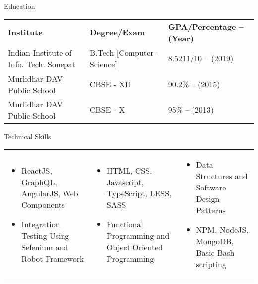 \documentclass[]{format}
\begin{document}
	\begin{cvsection}{Education}
	
	    \vspace{2pt}
	
		\begin{tabu} to 1\textwidth { X[l,p] X[c,p] X[r,p] }
			\textbf{Institute} & \textbf{Degree/Exam} & \textbf{GPA/Percentage – (Year)} \\
			Indian Institute of Info. Tech. Sonepat & B.Tech [Computer-Science] & 8.5211/10 – (2019) \\
			Murlidhar DAV Public School & CBSE - XII & 90.2\% – (2015) \\
			Murlidhar DAV Public School & CBSE - X & 95\% – (2013)
		\end{tabu}
		
	\end{cvsection}

	\vspace{-5pt}

	\begin{cvsection}{Technical Skills}
	\vspace{-6pt}
	\hspace{1.925pt}
		\begin{tabu} to 1\textwidth { X[l,p] X[l,p] X[0.7l,p] }
			\begin{itemize}
			    \item ReactJS, GraphQL, AngularJS, Web Components
			    \item Integration Testing Using Selenium and Robot Framework
			\end{itemize} & \begin{itemize}
			    \item HTML, CSS, Javascript, TypeScript, LESS, SASS
			    \item Functional Programming and Object Oriented Programming
			\end{itemize} & \begin{itemize}
			    \item Data Structures and Software Design Patterns
			    \item NPM, NodeJS, MongoDB, Basic Bash scripting
			\end{itemize}
		\end{tabu}
	\end{cvsection}
	
	\vspace{-20pt}
	
\end{document}
